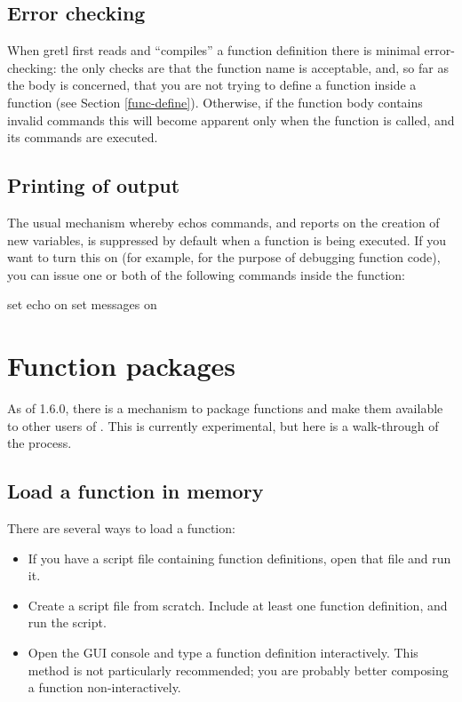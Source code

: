\subsection{Error checking}

When gretl first reads and ``compiles'' a function definition there is
minimal error-checking: the only checks are that the function name is
acceptable, and, so far as the body is concerned, that you are not
trying to define a function inside a function (see Section
\ref{func-define}). Otherwise, if the function body contains invalid
commands this will become apparent only when the function is called,
and its commands are executed.


\subsection{Printing of output}

The usual mechanism whereby  echos commands, and reports on
the creation of new variables, is suppressed by default when a
function is being executed.  If you want to turn this on (for example,
for the purpose of debugging function code), you can issue one or both
of the following commands inside the function:
%
\begin{code}
set echo on
set messages on
\end{code}

\section{Function packages}
\label{sec:func-packages}

As of  1.6.0, there is a mechanism to package functions and
make them available to other users of .  This is currently
experimental, but here is a walk-through of the process.

\subsection{Load a function in memory}

There are several ways to load a function:

\begin{itemize}
\item If you have a script file containing function definitions, open
  that file and run it.
\item Create a script file from scratch.  Include at least one
  function definition, and run the script.
\item Open the GUI console and type a function definition
  interactively.  This method is not particularly recommended; you are
  probably better composing a function non-interactively.
\end{itemize}


